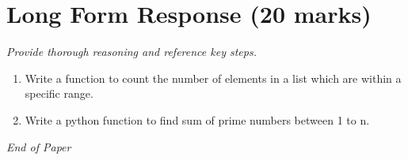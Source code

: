 \documentclass[12pt]{article}
\begin{document}
\section*{Long Form Response (20 marks)}
\textit{Provide thorough reasoning and reference key steps.}
\begin{enumerate}[label=\arabic*.]
\item Write a function to count the number of elements in a list which are within a specific
range.
\item Write a python function to find sum of prime numbers between 1 to n.
\end{enumerate}

\vfill
\noindent\textit{End of Paper}
\end{document}
